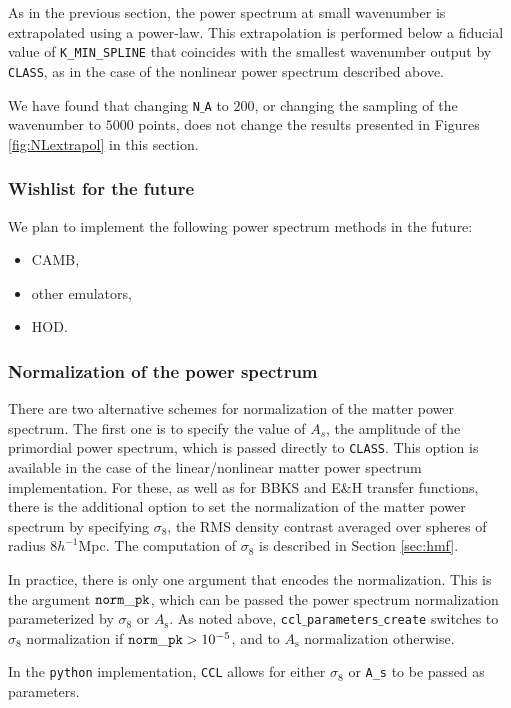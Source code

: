 \documentclass[\docopts]{\docclass}
\begin{document}
As in the previous section, the power spectrum at small wavenumber is extrapolated using a power-law. This extrapolation is performed below a fiducial value of {\tt K\_MIN\_SPLINE} that coincides with the smallest wavenumber output by {\tt CLASS}, as in the case of the nonlinear power spectrum described above.

We have found that changing {\tt N$\_$A} to $200$, or changing the sampling of the wavenumber to $5000$ points, does not change the results presented in Figures \ref{fig:NLextrapol} in this section.

\subsubsection{Wishlist for the future}
\label{Pk_wishlist}
We plan to implement the following power spectrum methods in the future:
\begin{itemize}
 \item CAMB,
 \item other emulators,
 \item HOD.
\end{itemize}


\subsubsection{Normalization of the power spectrum}
\label{sec:PSnorm}

There are two alternative schemes for normalization of the matter power spectrum. The first one is to specify the value of $A_s$, the amplitude of the primordial power spectrum, which is passed directly to {\tt CLASS}. This option is available in the case of the linear/nonlinear matter power spectrum implementation. For these, as well as for BBKS and E\&H transfer functions, there is the additional option to set the normalization of the matter power spectrum by specifying $\sigma_8$, the RMS density contrast averaged over spheres of radius $8h^{-1}$Mpc. The computation of $\sigma_8$ is described in Section \ref{sec:hmf}.

In practice, there is only one argument that encodes the normalization. This is the argument ${\tt norm\_pk}$, which can be passed the power spectrum normalization parameterized by $\sigma_8$ or $A_\mathrm{s}$. As noted above, {\tt ccl$\_$parameters$\_$create} switches to $\sigma_8$ normalization if ${\tt norm\_pk} > 10^{-5}$, and to $A_{\mathrm s}$ normalization otherwise.

In the {\tt python} implementation, {\tt CCL} allows for either $\sigma_8$ or {\tt A\_s} to be passed as parameters.
\end{document}
